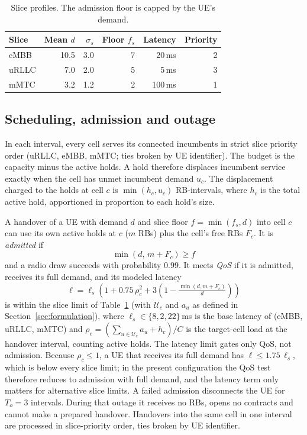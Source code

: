 \documentclass[conference]{IEEEtran}
\begin{document}
\begin{table}[!t]
\centering
\caption{Slice profiles. The admission floor is capped by the UE's demand.}
\label{tab:slices}
\begin{tabular}{lrrrrr}
\toprule
Slice & Mean $d$ & $\sigma_s$ & Floor $f_s$ & Latency & Priority\\
\midrule
eMBB & 10.5 & 3.0 & 7 & 20\,ms & 2\\
uRLLC & 7.0 & 2.0 & 5 & 5\,ms & 3\\
mMTC & 3.2 & 1.2 & 2 & 100\,ms & 1\\
\bottomrule
\end{tabular}
\end{table}

\subsection{Scheduling, admission and outage}
In each interval, every cell serves its connected incumbents in strict slice priority order (uRLLC, eMBB, mMTC; ties broken by UE identifier). The budget is the capacity minus the active holds. A hold therefore displaces incumbent service exactly when the cell has unmet incumbent demand $u_c$. The displacement charged to the holds at cell $c$ is $\min(h_c,u_c)$ RB-intervals, where $h_c$ is the total active hold, apportioned in proportion to each hold's size.

A handover of a UE with demand $d$ and slice floor $f=\min(f_s,d)$ into cell $c$ can use its own active holds at $c$ ($m$ RBs) plus the cell's free RBs $F_c$. It is \emph{admitted} if
\begin{equation}\label{eq:admit}
\min(d,\,m+F_c)\ge f
\end{equation}
and a radio draw succeeds with probability $0.99$. It meets \emph{QoS} if it is admitted, receives its full demand, and its modeled latency
\begin{equation}\label{eq:latency}
\ell=\ell_s\left(1+0.75\,\rho_c^2+3\left(1-\tfrac{\min(d,m+F_c)}{d}\right)\right)
\end{equation}
is within the slice limit of Table~\ref{tab:slices} (with $\mathcal{U}_c$ and $a_u$ as defined in Section~\ref{sec:formulation}), where $\ell_s\in\{8,2,22\}$\,ms is the base latency of (eMBB, uRLLC, mMTC) and $\rho_c=(\sum_{u\in\mathcal{U}_c}a_u+h_c)/C$ is the target-cell load at the handover interval, counting active holds. The latency limit gates only QoS, not admission. Because $\rho_c\le1$, a UE that receives its full demand has $\ell\le1.75\,\ell_s$, which is below every slice limit; in the present configuration the QoS test therefore reduces to admission with full demand, and the latency term only matters for alternative slice limits. A failed admission disconnects the UE for $T_o=3$ intervals. During that outage it receives no RBs, opens no contracts and cannot make a prepared handover. Handovers into the same cell in one interval are processed in slice-priority order, ties broken by UE identifier.
\end{document}

